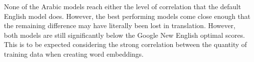 None of the Arabic models reach either the level of correlation that the default English model does. However, the best performing models come close enough that the remaining difference may have literally been lost in translation. However, both models are still significantly below the Google New English optimal scores. This is to be expected considering the strong correlation between the quantity of training data when creating word embeddings.